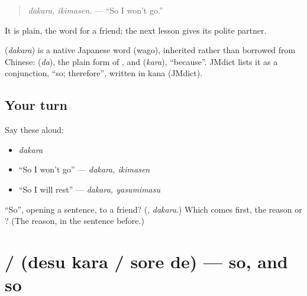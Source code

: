 \begin{quote}
\textbf{}
\end{quote}

\begin{quote}
\emph{dakara, ikimasen.} — \textquotedblleft{}So I won't go.\textquotedblright{}
\end{quote}

It is plain, the word for a friend; the next lesson gives its polite partner.

\begin{cousinweb}
\textbf{} (\emph{dakara}) is a native Japanese word (wago), inherited rather than borrowed from Chinese: \textbf{} (\emph{da}), the plain form of \textbf{}, and \textbf{} (\emph{kara}), \textquotedblleft{}because\textquotedblright{}. JMdict lists it as a conjunction, \textquotedblleft{}so; therefore\textquotedblright{}, written in kana (JMdict).
\end{cousinweb}

\subsection*{Your turn}
Say these aloud:

\begin{itemize}
\raggedright
  \item \emph{dakara}
  \item \textquotedblleft{}So I won't go\textquotedblright{} — \emph{dakara, ikimasen}
  \item \textquotedblleft{}So I will rest\textquotedblright{} — \emph{dakara, yasumimasu}
\end{itemize}

\begin{tcolorbox}[breakable,colback=teal!4,colframe=teal!35!black,title={Before you move on}]
\textquotedblleft{}So\textquotedblright{}, opening a sentence, to a friend? (\textbf{}, \emph{dakara}.) Which comes first, the reason or \textbf{}? (The reason, in the sentence before.)
\end{tcolorbox}
\section[\texorpdfstring{\ja{ですから} / \ja{それで} (desu kara / sore de)}{ですから / それで (desu kara / sore de)}]{ /  (desu kara / sore de) — so, and so}

\label{lesson:JA-C255-desu-kara}



